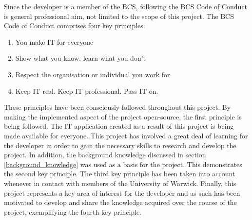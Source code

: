 %
%

Since the developer is a member of the BCS, following the BCS Code of Conduct \cite{bcs_code_of_conduct} is general professional aim, not limited to the scope of this project. The BCS Code of Conduct comprises four key principles:
\begin{enumerate}
  \item You make IT for everyone
  \item Show what you know, learn what you don't
  \item Respect the organisation or individual you work for
  \item Keep IT real. Keep IT professional. Pass IT on.
\end{enumerate}

These principles have been consciously followed throughout this project. By making the implemented aspect of the project open-source, the first principle is being followed. The IT application created as a result of this project is being made available for everyone. This project has involved a great deal of learning for the developer in order to gain the necessary skills to research and develop the project. In addition, the background knowledge discussed in section \ref{background_knowledge} was used as a basis for the project. This demonstrates the second key principle. The third key principle has been taken into account whenever in contact with members of the University of Warwick. Finally, this project represents a key area of interest for the developer and as such has been motivated to develop and share the knowledge acquired over the course of the project, exemplifying the fourth key principle.
